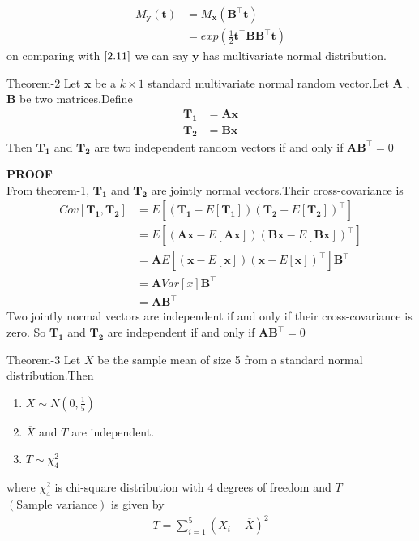 \documentclass{beamer}
\renewcommand{\vec}[1]{\mathbf{#1}}
\providecommand{\brak}[1]{\ensuremath{\left(#1\right)}}
\providecommand{\mean}[1]{E[ #1 ]}
\providecommand{\sbrak}[1]{\ensuremath{{}\left[#1\right]}}
\begin{document}
\begin{frame}
\begin{align}
    M_{\vec{y}}\brak{\vec{t}}&=M_{\vec{x}}\brak{\vec{B}^{\top}\vec{t}}\\
    &=exp\brak{\frac{1}{2}\vec{t}^{\top}\vec{B}\vec{B}^{\top}\vec{t}}
\end{align}
on comparing with $\eqref{2.11}$ we can say $\vec{y}$ has multivariate normal distribution.
\begin{block}{Theorem-2}
Let $\vec{x}$ be a $k\times 1$ standard multivariate normal random vector.Let $\vec{A}$ ,$\vec{B}$ be two matrices.Define
\begin{align}
    \vec{T_1}&=\vec{A}\vec{x}\\
    \vec{T_2}&=\vec{B}\vec{x}
\end{align}
Then $\vec{T_1}$ and $\vec{T_2}$ are two independent random vectors if and only if $\vec{A}\vec{B}^{\top}=0$
\end{block}
\end{frame}
\begin{frame}
\textbf{PROOF}\\
From theorem-1, $\vec{T_1}$ and $\vec{T_2}$ are  jointly normal vectors.Their cross-covariance is
\begin{align}
    Cov\sbrak{\vec{T_1},\vec{T_2}}&=\mean{\brak{\vec{T_1}-\mean{\vec{T_1}}}\brak{\vec{T_2}-\mean{\vec{T_2}}}^{\top}}\\
    &=\mean{\brak{\vec{A}\vec{x}-\mean{\vec{A}\vec{x}}}\brak{\vec{B}\vec{x}-\mean{\vec{B}\vec{x}}}^{\top}}\\
    &=\vec{A}\mean{\brak{\vec{x}-\mean{\vec{x}}}\brak{\vec{x}-\mean{\vec{x}}}^{\top}}\vec{B}^{\top}\\
    &=\vec{A}Var\sbrak{x}\vec{B}^{\top}\\
    &=\vec{A}\vec{B}^{\top}
\end{align}
Two jointly normal vectors are independent if and only if their cross-covariance is zero.
So $\vec{T_1}$ and $\vec{T_2}$ are independent if and only if $\vec{A}\vec{B}^{\top}=0$    
\end{frame}
\begin{frame}
\begin{block}{Theorem-3}
  Let $\overline{X}$ be the sample mean of size 5 from a standard normal distribution.Then
\begin{enumerate}
    \item $\overline{X} \sim N(0,\frac{1}{5})$
    \item $\overline{X}$ and $T$ are independent.
    \item $T \sim \chi_{4}^2$
\end{enumerate} 
where $\chi_{4}^2$  is  chi-square distribution
with   $4$ degrees of freedom and $T$\brak{\text{Sample variance}} is given by
\begin{align}
    T=\sum_{i=1}^{5}(X_i-\overline{X})^2
\end{align}
\end{block}
\end{frame}
\end{document}
